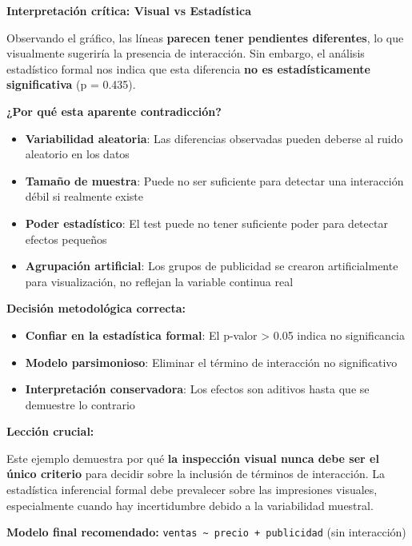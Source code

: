 \documentclass[
  letterpaper,
  DIV=11,
  numbers=noendperiod]{scrreprt}
\providecommand{\tightlist}{%
  \setlength{\itemsep}{0pt}\setlength{\parskip}{0pt}}
\begin{document}
\begin{tcolorbox}
\textbf{Interpretación crítica: Visual vs Estadística}

Observando el gráfico, las líneas \textbf{parecen tener pendientes
diferentes}, lo que visualmente sugeriría la presencia de interacción.
Sin embargo, el análisis estadístico formal nos indica que esta
diferencia \textbf{no es estadísticamente significativa} (p = 0.435).

\textbf{¿Por qué esta aparente contradicción?}

\begin{itemize}
\tightlist
\item
  \textbf{Variabilidad aleatoria}: Las diferencias observadas pueden
  deberse al ruido aleatorio en los datos
\item
  \textbf{Tamaño de muestra}: Puede no ser suficiente para detectar una
  interacción débil si realmente existe
\item
  \textbf{Poder estadístico}: El test puede no tener suficiente poder
  para detectar efectos pequeños
\item
  \textbf{Agrupación artificial}: Los grupos de publicidad se crearon
  artificialmente para visualización, no reflejan la variable continua
  real
\end{itemize}

\textbf{Decisión metodológica correcta:}

\begin{itemize}
\tightlist
\item
  \textbf{Confiar en la estadística formal}: El p-valor \textgreater{}
  0.05 indica no significancia
\item
  \textbf{Modelo parsimonioso}: Eliminar el término de interacción no
  significativo
\item
  \textbf{Interpretación conservadora}: Los efectos son aditivos hasta
  que se demuestre lo contrario
\end{itemize}

\textbf{Lección crucial:}

Este ejemplo demuestra por qué \textbf{la inspección visual nunca debe
ser el único criterio} para decidir sobre la inclusión de términos de
interacción. La estadística inferencial formal debe prevalecer sobre las
impresiones visuales, especialmente cuando hay incertidumbre debido a la
variabilidad muestral.

\textbf{Modelo final recomendado:}
\texttt{ventas\ \textasciitilde{}\ precio\ +\ publicidad} (sin
interacción)

\end{tcolorbox}
\end{document}
